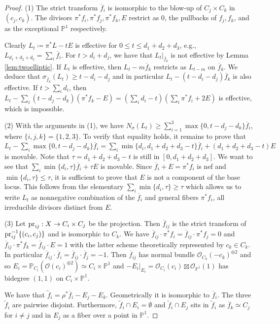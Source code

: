 \documentclass[12pt]{amsart}
\theoremstyle{definition}
\newcommand{\bb}{\ensuremath{\mathfrak{b}}}
\renewcommand{\geq}{\geqslant}
\renewcommand{\leq}{\leqslant}
\newcommand{\?}{ \circled{{\large\bf ?}}}
\let\cal\mathcal
\let\bb\mathbb
\begin{document}
\begin{proof}
	(1) The strict transform $\overline f_i$ is isomorphic to the blow-up of $C_j\times C_k$ in $(c_j,c_k)$. The divisors $\pi^*f_i,\pi^*f_j,\pi^*f_k, E$ restrict as $0$, the pullbacks of $f_j,f_k$, and as the exceptional $\bb P^1$ respectively.
	
	Clearly $L_t\coloneqq \pi^*L-tE$ is effective for $0\leq t\leq d_1+d_2+d_3$, e.g., $L_{d_1+d_2+d_3}=\sum_i\overline f_i$. 
	For $t>d_i+d_j$, we have that $L_t|_{\overline f_k}$ is not effective by Lemma \ref{lem:twoelliptic}. If $L_t$ is effective, then $L_t-m\overline f_k$ restricts as $L_{t-m}$ on $\overline f_k$. We deduce that $\sigma_{\overline f_k}(L_t)\geq t-d_i-d_j$ and in particular $L_t-(t-d_i-d_j)\overline f_k$ is also effective. If $t>\sum_id_i$, then $L_t-\sum_i(t-d_j-d_k)(\pi^*f_k-E)=(\sum_id_i-t)(\sum_i\pi^*f_i+2E)$ is effective, which is impossible. 
	
	(2) With the arguments in (1), we have	$N_{\sigma}(L_t)\geq \sum_{i=1}^3\max\{0,t-d_j-d_k\}\overline f_i$, where $\{i,j,k\}=\{1,2,3\}$. To verify that equality holds, it remains to prove that $L_t-\sum_i\max\{0,t-d_j-d_k\}\overline f_i=\sum_i\min\{d_i,d_1+d_2+d_3-t\}\overline f_i+(d_1+d_2+d_3-t)E$ is movable. Note that $\tau=d_1+d_2+d_3-t$ is still in $[0,d_1+d_2+d_3]$. We want to see that $\sum_i\min\{d_i,\tau\}\overline f_i+\tau E$ is movable. Since $\overline f_i+E=\pi^*f_i$ is nef and $\min\{d_i,\tau\}\leq\tau$, it is sufficient to prove that $E$ is not a component of the base locus. This follows from the elementary $\sum_i\min\{d_i,\tau\}\geq\tau$ which allows us to write $L_t$ as nonnegative combination of the $\overline f_i$ and general fibers $\pi^*f_i$, all irreducible divisors distinct from $E$. 
	
	(3) Let ${\rm pr}_{ij}:X\to C_i\times C_j$ be the projection. Then $\overline f_{ij}$ is the strict transform of ${\rm pr}_{ij}^{-1}\{(c_i,c_j)\}$ and is isomorphic to $C_k$. We have $\overline f_{ij}\cdot \pi^*f_i=\overline f_{ij}\cdot \pi^*f_j=0$ and $\overline f_{ij}\cdot \pi^*f_k=\overline f_{ij}\cdot E=1$ with the latter scheme theoretically represented by $c_k\in C_k$. In particular $\overline f_{ij}\cdot\overline f_i=\overline f_{ij}\cdot\overline f_j=-1$. Then $\overline f_{ij}$ has normal bundle $\cal O_{C_k}(-c_k)^{\oplus 2}$ and so $E_i=\bb P_{C_i}(\cal O(c_i)^{\oplus 2})\simeq C_i\times\bb P^1$ and $-E_i|_{E_i}=\cal O_{C_i}(c_i)\boxtimes\cal O_{\bb P^1}(1)$ has bidegree $(1,1)$ on $C_i\times\bb P^1$.
	
	We have that $\widetilde f_i=\rho^*\overline f_i-E_j-E_k$. Geometrically it is isomorphic to $\overline f_i$. The three $\widetilde f_i$ are pairwise disjoint. Furthermore, $\widetilde f_i\cap E_i=\emptyset$ and $\widetilde f_i\cap E_j$ sits in $\widetilde f_i$ as $\overline f_k\simeq C_j$ for $i\neq j$ and in $E_j$ as a fiber over a point in $\bb P^1$.
	

\end{proof}
\end{document}
